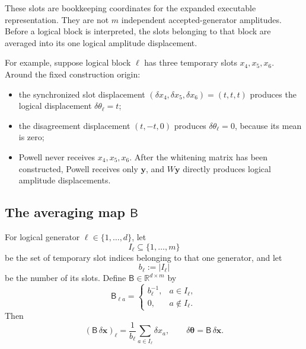 \documentclass[11pt]{article}
\newcommand{\R}{\mathbb R}
\begin{document}
These slots are bookkeeping coordinates for the expanded executable
representation.  They are not \(m\) independent accepted-generator
amplitudes.  Before a logical block is interpreted, the slots belonging to
that block are averaged into its one logical amplitude displacement.

For example, suppose logical block \(\ell\) has three temporary slots
\(x_4,x_5,x_6\).  Around the fixed construction origin:
\begin{itemize}[leftmargin=1.7em,itemsep=2pt,topsep=3pt]
\item the synchronized slot displacement
\((\delta x_4,\delta x_5,\delta x_6)=(t,t,t)\) produces the logical
displacement \(\delta\theta_\ell=t\);
\item the disagreement displacement
\((t,-t,0)\) produces \(\delta\theta_\ell=0\), because its mean is zero;
\item Powell never receives \(x_4,x_5,x_6\).  After the whitening matrix has
been constructed, Powell receives only \(\mathbf y\), and \(W\mathbf y\)
directly produces logical amplitude displacements.
\end{itemize}

\noindent{}

\subsection*{The averaging map \(\mathsf B\)}

For logical generator \(\ell\in\{1,\ldots,d\}\), let
\begin{equation}
I_\ell\subseteq\{1,\ldots,m\}
\label{eq:block-index-set}
\end{equation}
be the set of temporary slot indices belonging to that one generator, and
let
\begin{equation}
b_\ell:=|I_\ell|
\label{eq:block-size}
\end{equation}
be the number of its slots.  Define
\(\mathsf B\in\R^{d\times m}\) by
\begin{equation}
\mathsf B_{\ell a}
=
\begin{cases}
b_\ell^{-1}, & a\in I_\ell,\\
0, & a\notin I_\ell.
\end{cases}
\label{eq:B-entrywise}
\end{equation}
Then
\begin{equation}
(\mathsf B\,\delta\mathbf x)_\ell
=
\frac{1}{b_\ell}
\sum_{a\in I_\ell}\delta x_a,
\qquad
\delta\boldsymbol\theta
=
\mathsf B\,\delta\mathbf x.
\label{eq:B-map}
\end{equation}
\end{document}

